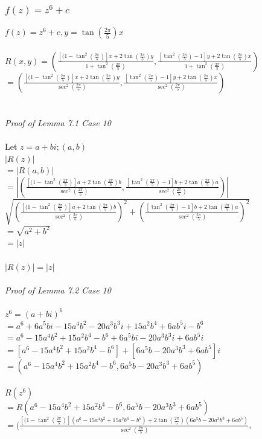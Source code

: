 \documentclass{article}
\begin{document}
\subsubsection{$f(z) = z^6 + c$}
\underline{$f(z) = z^6 + c, y=\tan(\frac{2\pi}{5})x$}
\\
\\
$R(x,y) = (\frac{[(1-\tan^2(\frac{2\pi}{5})]x+2\tan(\frac{2\pi}{5})y}{1+\tan^2(\frac{2\pi}{5})}, \frac{[\tan^2(\frac{2\pi}{5})-1]y+2\tan(\frac{2\pi}{5})x}{1+\tan^2(\frac{2\pi}{5})})$
\\$= (\frac{[(1-\tan^2(\frac{2\pi}{5})]x+2\tan(\frac{2\pi}{5})y}{\sec^2(\frac{2\pi}{5})}, \frac{[\tan^2(\frac{2\pi}{5})-1]y+2\tan(\frac{2\pi}{5})x}{\sec^2(\frac{2\pi}{5})})$
\\
\\
\\\textit{Proof of Lemma 7.1 Case 10}
\\
\\Let $z=a+bi; (a,b)$
\\$|R(z)|$
\\$= |R(a,b)|$
\\$=|(\frac{[(1-\tan^2(\frac{2\pi}{5})]a+2\tan(\frac{2\pi}{5})b}{\sec^2(\frac{2\pi}{5})},\frac{[\tan^2(\frac{2\pi}{5})-1]b+2\tan(\frac{2\pi}{5})a}{\sec^2(\frac{2\pi}{5})})|$
\\$\sqrt{(\frac{[(1-\tan^2(\frac{2\pi}{5})]a+2\tan(\frac{2\pi}{5})b}{\sec^2(\frac{2\pi}{5})})^2+(\frac{[\tan^2(\frac{2\pi}{5})-1]b+2\tan(\frac{2\pi}{5})a}{\sec^2(\frac{2\pi}{5})})^2}$
\\$= \sqrt{a^2+b^2}$
\\$= |z|$
\\
\\$|R(z)| = |z|$
\\
\\\textit{Proof of Lemma 7.2 Case 10}
\\
\\$z^6 = (a+bi)^6$
\\$= a^6+6a^5bi-15a^4b^2-20a^3b^3i+15a^2b^4+6ab^5i-b^6$
\\$= a^6-15a^4b^2+15a^2b^4-b^6+6a^5bi-20a^3b^3i+6ab^5i$
\\$= [a^6-15a^4b^2+15a^2b^4-b^6]+[6a^5b-20a^3b^3+6ab^5]i$
\\$= (a^6-15a^4b^2+15a^2b^4-b^6, 6a^5b-20a^3b^3+6ab^5)$
\\
\\$R(z^6)$
\\$= R(a^6-15a^4b^2+15a^2b^4-b^6, 6a^5b-20a^3b^3+6ab^5)$
\\$= (\frac{[(1-\tan^2(\frac{2\pi}{5})](a^6-15a^4b^2+15a^2b^4-b^6)+2\tan(\frac{2\pi}{5})(6a^5b-20a^3b^3+6ab^5)}{\sec^2(\frac{2\pi}{5})}$, 
\end{document}
